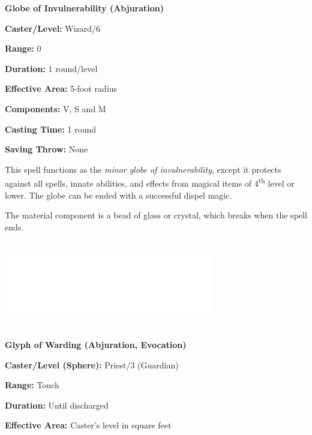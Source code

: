 \begin{multicols}{2}
\vspace{1em}

\noindent
\begin{minipage}{\columnwidth}

\noindent \textbf{Globe of Invulnerability (Abjuration)}

\noindent \textbf{Caster/Level:} Wizard/6

\noindent \textbf{Range:} 0

\noindent \textbf{Duration:} 1 round/level

\noindent \textbf{Effective Area:} 5-foot radius

\noindent \textbf{Components:} V, S and M

\noindent \textbf{Casting Time:} 1 round

\noindent \textbf{Saving Throw:} None

\end{minipage}

This spell functions as the \textit{minor globe of invulnerability}, except it protects against all spells, innate abilities, and effects from magical items of 4\textsuperscript{th} level or lower.  The globe can be ended with a successful dispel magic.

The material component is a bead of glass or crystal, which breaks when the spell ends.

\noindent\includegraphics[width=3.6in, height=1.5in]{testblock.pdf}


\vspace{1em}

\noindent
\begin{minipage}{\columnwidth}

\noindent \textbf{Glyph of Warding (Abjuration, Evocation)}

\noindent \textbf{Caster/Level (Sphere):} Priest/3 (Guardian)

\noindent \textbf{Range:} Touch

\noindent \textbf{Duration:} Until discharged

\noindent \textbf{Effective Area:} Caster's level in square feet


\end{minipage}
\end{multicols}
